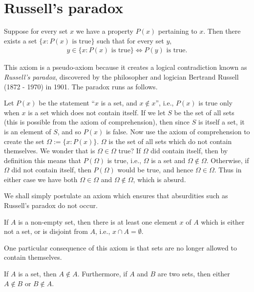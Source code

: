 \section{Russell's paradox}

\begin{pseudoaxiom}
    Suppose for every set $x$ we have a property $P(x)$ pertaining to $x$. Then there exists a set $\{x : P(x) \text{ is true}\}$ such that for every set $y$,
    \begin{align*}
        y \in \{x : P(x) \text{ is true}\}
        \Longleftrightarrow
        P(y) \text{ is true}.
    \end{align*}
\end{pseudoaxiom}

This axiom is a pseudo-axiom because it creates a logical contradiction known as \emph{Russell's paradox}, discovered by the philosopher and logician Bertrand Russell (1872 - 1970) in 1901. The paradox runs as follows.

Let $P(x)$ be the statement ``$x$ is a set, and $x \notin x$'', i.e., $P(x)$ is true only when $x$ is a set which does not contain itself. If we let $S$ be the set of all sets (this is possible from the axiom of comprehension), then since $S$ is itself a set, it is an element of $S$, and so $P(x)$ is false. Now use the axiom of comprehension to create the set $\Omega := \{x : P(x)\}$. $\Omega$ is the set of all sets which do not contain themselves. We wonder that is $\Omega \in \Omega$ true? If $\Omega$ did contain itself, then by definition this means that $P(\Omega)$ is true, i.e., $\Omega$ is a set and $\Omega \notin \Omega$. Otherwise, if $\Omega$ did not contain itself, then $P(\Omega)$ would be true, and hence $\Omega \in \Omega$. Thus in either case we have both $\Omega \in \Omega$ and $\Omega \notin \Omega$, which is absurd.

We shall simply postulate an axiom which ensures that absurdities such as Russell's paradox do not occur.

\begin{axiom}\label{axiom:regularity}
    If $A$ is a non-empty set, then there is at least one element $x$ of $A$ which is either not a set, or is disjoint from $A$, i.e., $x \cap A = \emptyset$.
\end{axiom}

One particular consequence of this axiom is that sets are no longer allowed to contain themselves.

\begin{lemma}
    If $A$ is a set, then $A \notin A$. Furthermore, if $A$ and $B$ are two sets, then either $A \notin B$ or $B \notin A$.
\end{lemma}

